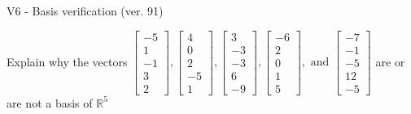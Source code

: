 \begin{exercise}
  \begin{exerciseTitle}V6 - Basis verification (ver. 91)\end{exerciseTitle}
  \begin{exerciseStatement}
    Explain why the vectors \(\left[\begin{array}{r}
-5 \\
1 \\
-1 \\
3 \\
2
\end{array}\right] , \left[\begin{array}{r}
4 \\
0 \\
2 \\
-5 \\
1
\end{array}\right] , \left[\begin{array}{r}
3 \\
-3 \\
-3 \\
6 \\
-9
\end{array}\right] , \left[\begin{array}{r}
-6 \\
2 \\
0 \\
1 \\
5
\end{array}\right] , \text{ and } \left[\begin{array}{r}
-7 \\
-1 \\
-5 \\
12 \\
-5
\end{array}\right]\) are or are not a basis of \(\mathbb{R}^5\)	



\end{exerciseStatement}
\end{exercise}
